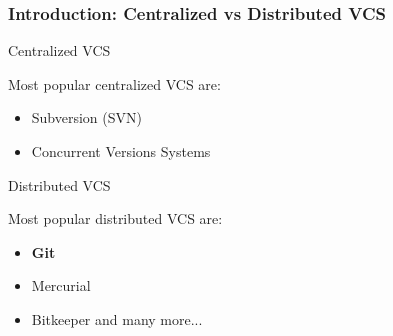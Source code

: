 \begin{frame}

\frametitle{Introduction: Centralized vs Distributed VCS}

\begin{block}{Centralized VCS}

Most popular centralized VCS are:

\begin{itemize}
\item Subversion (SVN)
\item Concurrent Versions Systems
\end{itemize}

\end{block}
\begin{block}{Distributed VCS}

Most popular distributed VCS are:

\begin{itemize}
\item \textbf{Git}
\item Mercurial
\item Bitkeeper and many more...
\end{itemize}

\end{block}
\end{frame}